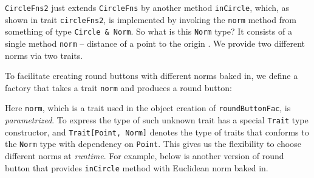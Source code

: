 \lstinline{CircleFns2} just extends \lstinline{CircleFns} by another method
\lstinline{inCircle}, which, as shown in trait \lstinline{circleFns2}, is
implemented by invoking the \lstinline{norm} method from something of type
\lstinline{Circle & Norm}. So what is this \lstinline{Norm} type? It consists of
a single method \lstinline{norm} -- distance of a point to the origin . We
provide two different norms via two traits.

To facilitate creating round buttons with different norms baked in, we define a
factory that takes a trait \lstinline$norm$ and produces a round button:

Here \lstinline{norm}, which is a trait used in the object creation of
\lstinline{roundButtonFac}, is \emph{parametrized}. To express the
type of such unknown trait \name has a special 
\lstinline{Trait} type constructor, and \lstinline$Trait[Point, Norm]$
denotes the type of traits that conforms to the \lstinline$Norm$ type with dependency
on \lstinline{Point}. This gives us the
flexibility to choose different norms at \emph{runtime}. For example, below is another version of
round button that provides \lstinline{inCircle} method with Euclidean norm baked
in.

 
